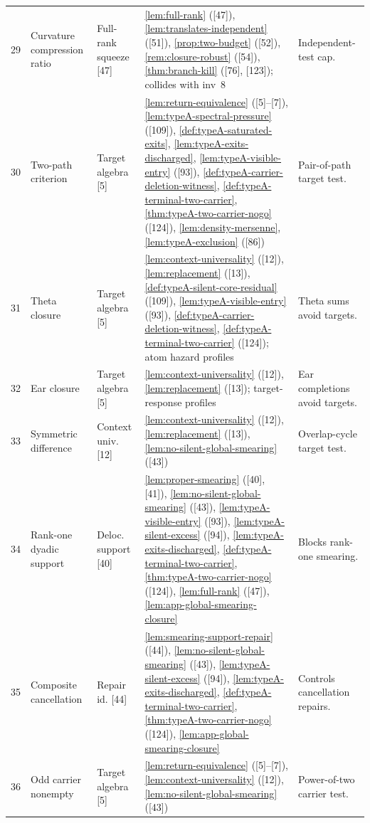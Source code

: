 \documentclass[11pt]{article}
\begin{document}
{\begin{longtable}{C{0.032\textwidth} L{0.145\textwidth} L{0.105\textwidth} L{0.50\textwidth} L{0.155\textwidth}}
29 & Curvature compression ratio & Full-rank squeeze {[47]} & \cref{lem:full-rank} ([47]), \cref{lem:translates-independent} ([51]), \cref{prop:two-budget} ([52]), \cref{rem:closure-robust} ([54]), \cref{thm:branch-kill} ([76], [123]); collides with inv~8 & Independent-test cap. \\
30 & Two-path criterion & Target algebra {[5]} & \cref{lem:return-equivalence} ([5]--[7]), \cref{lem:typeA-spectral-pressure} ([109]), \cref{def:typeA-saturated-exits}, \cref{lem:typeA-exits-discharged}, \cref{lem:typeA-visible-entry} ([93]), \cref{def:typeA-carrier-deletion-witness}, \cref{def:typeA-terminal-two-carrier}, \cref{thm:typeA-two-carrier-nogo} ([124]), \cref{lem:density-mersenne}, \cref{lem:typeA-exclusion} ([86]) & Pair-of-path target test. \\
31 & Theta closure & Target algebra {[5]} & \cref{lem:context-universality} ([12]), \cref{lem:replacement} ([13]), \cref{def:typeA-silent-core-residual} ([109]), \cref{lem:typeA-visible-entry} ([93]), \cref{def:typeA-carrier-deletion-witness}, \cref{def:typeA-terminal-two-carrier} ([124]); atom hazard profiles & Theta sums avoid targets. \\
32 & Ear closure & Target algebra {[5]} & \cref{lem:context-universality} ([12]), \cref{lem:replacement} ([13]); target-response profiles & Ear completions avoid targets. \\
33 & Symmetric difference & Context univ. {[12]} & \cref{lem:context-universality} ([12]), \cref{lem:replacement} ([13]), \cref{lem:no-silent-global-smearing} ([43]) & Overlap-cycle target test. \\
34 & Rank-one dyadic support & Deloc. support {[40]} & \cref{lem:proper-smearing} ([40], [41]), \cref{lem:no-silent-global-smearing} ([43]), \cref{lem:typeA-visible-entry} ([93]), \cref{lem:typeA-silent-excess} ([94]), \cref{lem:typeA-exits-discharged}, \cref{def:typeA-terminal-two-carrier}, \cref{thm:typeA-two-carrier-nogo} ([124]), \cref{lem:full-rank} ([47]), \cref{lem:app-global-smearing-closure} & Blocks rank-one smearing. \\
35 & Composite cancellation & Repair id. {[44]} & \cref{lem:smearing-support-repair} ([44]), \cref{lem:no-silent-global-smearing} ([43]), \cref{lem:typeA-silent-excess} ([94]), \cref{lem:typeA-exits-discharged}, \cref{def:typeA-terminal-two-carrier}, \cref{thm:typeA-two-carrier-nogo} ([124]), \cref{lem:app-global-smearing-closure} & Controls cancellation repairs. \\
36 & Odd carrier nonempty & Target algebra {[5]} & \cref{lem:return-equivalence} ([5]--[7]), \cref{lem:context-universality} ([12]), \cref{lem:no-silent-global-smearing} ([43]) & Power-of-two carrier test. \\

\end{longtable}}
\end{document}

